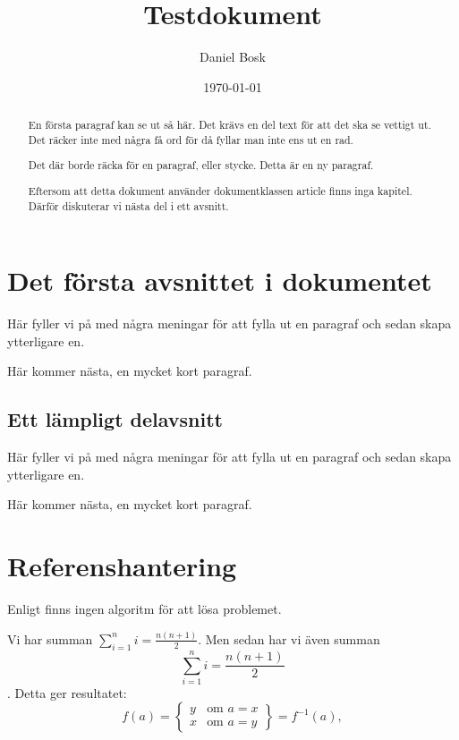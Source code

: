 \documentclass[a4paper]{article}
\author{Daniel Bosk}
\title{Testdokument}
\date{\today}
\begin{document}
	\maketitle

	\begin{abstract}
		\noindent
		En första paragraf kan se ut så här.
		Det krävs en del text för att det ska se vettigt ut.
		Det räcker inte med några få ord för då fyllar man inte ens ut en rad.

		Det där borde räcka för en paragraf, eller stycke.
		Detta är en ny paragraf.

		Eftersom att detta dokument använder dokumentklassen article finns inga 
		kapitel.
		Därför diskuterar vi nästa del i ett avsnitt.
	\end{abstract}

	\tableofcontents

	\section[Första avsnittet]{Det första avsnittet i dokumentet}
	\label{sec:First}
	\noindent
	Här fyller vi på med några meningar för att fylla ut en paragraf och sedan 
	skapa ytterligare en.

	Här kommer nästa, en mycket kort paragraf.

	\subsection[Delavsnittet]{Ett lämpligt delavsnitt}
	\label{sub:Del}
	\noindent
	Här fyller vi på med några meningar för att fylla ut en paragraf och sedan 
	skapa ytterligare en.

	Här kommer nästa, en mycket kort paragraf.


	\section{Referenshantering}
	\label{sec:Ref}
	\noindent
	Enligt \citet{Knuth1997toa} finns ingen algoritm för att lösa problemet.

	Vi har summan \( \sum_{i=1}^n i = \frac{n (n + 1)}{2} \).
	Men sedan har vi även summan \[ \sum_{i=1}^n i = \frac{n (n + 1)}{2} \].
	Detta ger resultatet:
	\[ f(a) = \left\{
		\begin{array}{ll}
			y & \text{om } a=x \\
			x & \text{om } a=y
		\end{array}
		\right\} = f^{-1}(a), \]
\end{document}
